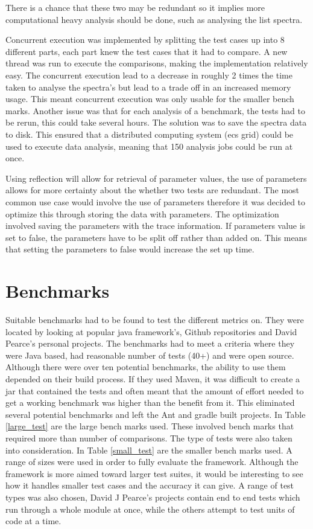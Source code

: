 There is a chance that these two may be redundant so it implies more computational heavy analysis should be done, such as analysing the list spectra. 

Concurrent execution was implemented by splitting the test cases up into 8 different parts, each part knew the test cases that it had to compare. A new thread was run to execute the comparisons, making the implementation relatively easy. The concurrent execution lead to a decrease in roughly 2 times the time taken to analyse the spectra's but lead to a trade off in an increased memory usage. This meant concurrent execution was only usable for the smaller bench marks.
Another issue was that for each analysis of a benchmark, the tests had to be rerun, this could take several hours. The solution was to save the spectra data to disk. This ensured that a distributed computing system (ecs grid) could be used to execute data analysis, meaning that 150 analysis jobs could be run at once.

Using reflection will allow for retrieval of parameter values, the use of parameters allows for more certainty about the whether two tests are redundant. The most common use case would involve the use of parameters therefore it was decided to optimize this through storing the data with parameters. The optimization involved saving the parameters with the trace information. If parameters value is set to false, the parameters have to be split off rather than added on. This means that setting the parameters to false would increase the set up time.

\section{Benchmarks}
\label{S:bench}
Suitable benchmarks had to be found to test the different metrics on. They were located by looking at popular java framework's, Github repositories and David Pearce's personal projects. The benchmarks had to meet a criteria where they were Java based, had reasonable number of tests (40+) and were open source. Although there were over ten potential benchmarks, the ability to use them depended on their build process. If they used Maven, it was difficult to create a jar that contained the tests and often meant that the amount of effort needed to get a working benchmark was higher than the benefit from it. This eliminated several potential benchmarks and left the Ant and gradle built projects. In Table \ref{large_test} are the large bench marks used. These involved bench marks that required more than  number of comparisons. The type of tests were also taken into consideration. In Table \ref{small_test} are the smaller bench marks used. A range of sizes were used in order to fully evaluate the framework. Although the framework is more aimed toward larger test suites, it would be interesting to see how it handles smaller test cases and the accuracy it can give. A range of test types was also chosen, David J Pearce's projects contain end to end tests which run through a whole module at once, while the others attempt to test units of code at a time.

